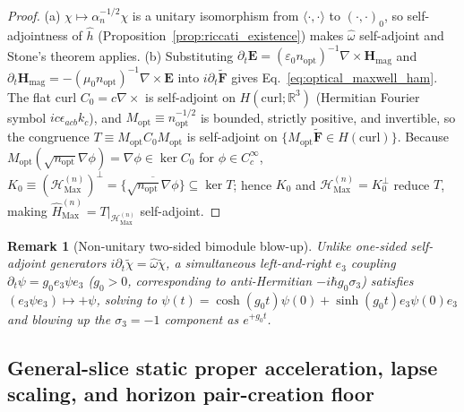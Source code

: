 \documentclass[aps,prd,onecolumn,tightenlines,nofootinbib,notitlepage,10pt,floatfix]{revtex4-2}
\theoremstyle{indentedtheorem}
\newtheorem{remark}{Remark}
\begin{document}
\begin{proof}
(a) $\chi\mapsto\alpha_n^{-1/2}\chi$ is a unitary isomorphism from $\langle\cdot,\cdot\rangle$ to $(\cdot,\cdot)_0$, so self-adjointness of $\hat{h}$ (Proposition~\ref{prop:riccati_existence}) makes $\hat{\omega}$ self-adjoint and Stone's theorem applies.
(b) Substituting $\partial_t\mathbf{E}=(\varepsilon_0 n_\text{opt})^{-1}\nabla\times\mathbf{H}_\text{mag}$ and $\partial_t\mathbf{H}_\text{mag}=-(\mu_0 n_\text{opt})^{-1}\nabla\times\mathbf{E}$ into $i\partial_t\tilde{\mathbf{F}}$ gives Eq.~\eqref{eq:optical_maxwell_ham}. The flat curl $C_0=c\nabla\times$ is self-adjoint on $H(\mathrm{curl};\mathbb{R}^3)$ (Hermitian Fourier symbol $ic\epsilon_{acb}k_c$), and $M_\text{opt}\equiv n_\text{opt}^{-1/2}$ is bounded, strictly positive, and invertible, so the congruence $T\equiv M_\text{opt}C_0 M_\text{opt}$ is self-adjoint on $\{M_\text{opt}\tilde{\mathbf{F}}\in H(\mathrm{curl})\}$. Because $M_\text{opt}(\sqrt{n_\text{opt}}\nabla\phi)=\nabla\phi\in\ker C_0$ for $\phi\in C_c^\infty$, $K_0\equiv(\mathcal{H}_\text{Max}^{(n)})^\perp=\overline{\{\sqrt{n_\text{opt}}\nabla\phi\}}\subseteq\ker T$; hence $K_0$ and $\mathcal{H}_\text{Max}^{(n)}=K_0^\perp$ reduce $T$, making $\hat{H}_\text{Max}^{(n)}=T|_{\mathcal{H}_\text{Max}^{(n)}}$ self-adjoint.
\end{proof}

\begin{remark}[Non-unitary two-sided bimodule blow-up]\label{rem:bimodule_flow}
Unlike one-sided self-adjoint generators $i\partial_t\tilde{\chi}=\hat{\omega}\tilde{\chi}$, a simultaneous left-and-right $e_3$ coupling $\partial_t\psi=g_0 e_3\psi e_3$ ($g_0>0$, corresponding to anti-Hermitian $-i\hbar g_0\sigma_3$) satisfies $(e_3\psi e_3)\mapsto +\psi$, solving to $\psi(t)=\cosh(g_0 t)\psi(0)+\sinh(g_0 t)e_3\psi(0)e_3$ and blowing up the $\sigma_3=-1$ component as $e^{+g_0 t}$.
\end{remark}

\subsection{General-slice static proper acceleration, lapse scaling, and horizon pair-creation floor}
\label{sec:horizon_bounds}
\end{document}
